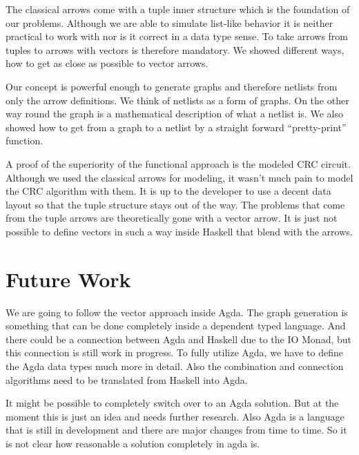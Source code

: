 \documentclass{llncs}
\begin{document}
\par
The classical arrows come with a tuple inner structure which is the foundation of our problems. Although we are able to simulate
list-like behavior it is neither practical to work with nor is it correct in a data type sense. To take arrows from tuples to
arrows with vectors is therefore mandatory. We showed different ways, how to get as close as possible to vector arrows. 

\par
Our concept is powerful enough to generate graphs and therefore netlists from only the arrow definitions. We think of netlists as
a form of graphs. On the other way round the graph is a mathematical description of what a netlist is. We also showed how to get
from a graph to a netlist by a straight forward ``pretty-print'' function.

\par
A proof of the superiority of the functional approach is the modeled CRC circuit. Although we used the classical arrows for
modeling, it wasn't much pain to model the CRC algorithm with them. It is up to the developer to use a decent data layout so that
the tuple structure stays out of the way. The problems that come from the tuple arrows are theoretically gone with a vector
arrow. It is just not possible to define vectors in such a way inside Haskell that blend with the arrows. 

\section{Future Work}
We are going to follow the vector approach inside Agda. The graph generation is something that can be done completely inside a
dependent typed language. And there could be a connection between Agda and Haskell due to the IO Monad, but this connection is
still work in progress. To fully utilize Agda, we have to define the Agda data types much more in detail. Also the combination and
connection algorithms need to be translated from Haskell into Agda.

\par
It might be possible to completely switch over to an Agda solution. But at the moment this is just an idea and needs further
research. Also Agda is a language that is still in development and there are major changes from time to time. So it is not clear
how reasonable a solution completely in agda is. 





\end{document}
